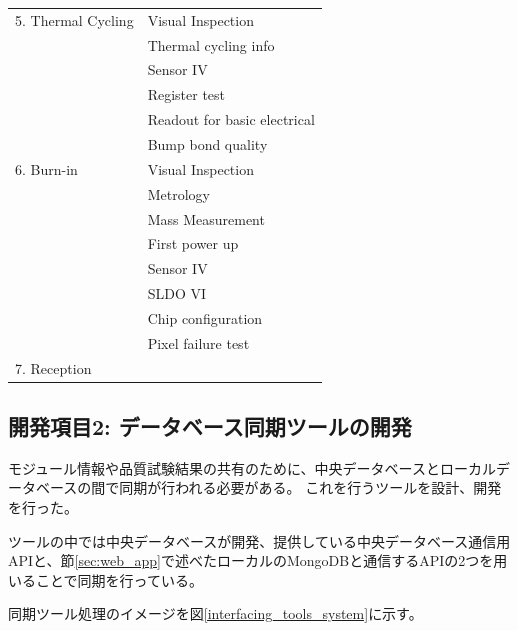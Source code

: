 \begin{table}[btp]
\begin{center}
\begin{tabular}{|ll|}
    5. Thermal Cycling      & Visual Inspection \\ 
                            & Thermal cycling info \\
                            & Sensor IV \\
                            & Register test\\
                            & Readout for basic electrical \\
                            & Bump bond quality \\\hline

    6. Burn-in              & Visual Inspection \\ 
                            & Metrology \\
                            & Mass Measurement \\
                            & First power up\\
                            & Sensor IV\\
                            & SLDO VI\\
                            & Chip configuration\\
                            & Pixel failure test\\\hline

    7. Reception            & \\\hline 
  \end{tabular}
\end{center}
\end{table}


\clearpage

\subsection{開発項目2: データベース同期ツールの開発} \label{sec:interfacing_tool}
モジュール情報や品質試験結果の共有のために、中央データベースとローカルデータベースの間で同期が行われる必要がある。
これを行うツールを設計、開発を行った。

ツールの中では中央データベースが開発、提供している中央データベース通信用APIと、節\ref{sec:web_app}で述べたローカルのMongoDBと通信するAPIの2つを用いることで同期を行っている。

同期ツール処理のイメージを図\ref{interfacing_tools_system}に示す。

